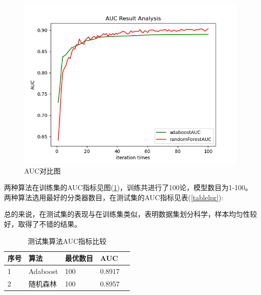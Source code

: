 \documentclass[a4paper,UTF8]{article}
\theoremstyle{definition}
\begin{document}
\begin{figure}[h]
\centering
\includegraphics[scale=0.8]{Figure_1.png}
\caption{AUC对比图}
\label{fig-lprlpr}
\end{figure}

两种算法在训练集的AUC指标见图(\ref{123321})，训练共进行了100论，模型数目为1-100。两种算法选用最好的分类器数目，在测试集的AUC指标见表(\ref{tablelpr}):

总的来说，在测试集的表现与在训练集类似，表明数据集划分科学，样本均匀性较好，取得了不错的结果。

\begin{table} \label{tablelpr}
\caption{测试集算法AUC指标比较}  
\begin{center}  \label{123321}
\begin{tabular}{|l|l|l|l| p{5cm}|}  
\hline  
序号 & 算法&最优数目 & AUC  \\ \hline  
1 & Adaboost & 100 & 0.8917 \\ \hline  
2 & 随机森林 & 100 & 0.8957 \\ \hline
\end{tabular}  
\end{center}  
\end{table}
\end{document}
